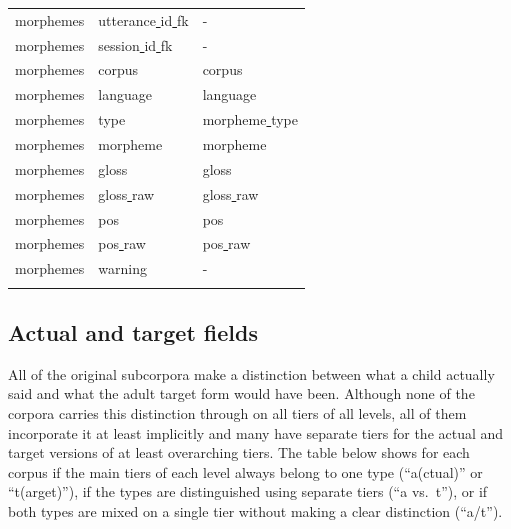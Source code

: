 \documentclass[a4paper, 11pt]{book}
\newcommand{\und}{\underline{{ }}\hspace{0.2mm}}	%
\begin{document}
\begin{longtable}[ht!]{lll}
		morphemes				& utterance\und id\und fk & - \\
		morphemes				& session\und id\und fk & - \\
		morphemes				& corpus				& corpus \\
		morphemes				& language				& language \\
		morphemes				& type					& morpheme\und type \\
		morphemes				& morpheme				& morpheme \\
		morphemes				& gloss					& gloss \\
		morphemes				& gloss\und raw			& gloss\und raw \\
		morphemes				& pos					& pos \\
		morphemes				& pos\und raw			& pos\und raw \\
		morphemes				& warning				& - \\

		\label{tab:Columns in the merged table}
\end{longtable}


\subsection{Actual and target fields}
\label{subsec:Actual and target fields}

All of the original subcorpora make a distinction between what a child actually said and what the adult target form would have been. Although none of the corpora carries this distinction through on all tiers of all levels, all of them incorporate it at least implicitly and many have separate tiers for the actual and target versions of at least overarching tiers. The table below shows for each corpus if the main tiers of each level always belong to one type (“a(ctual)” or “t(arget)”), if the types are distinguished using separate tiers (“a vs.\ t”), or if both types are mixed on a single tier without making a clear distinction (“a/t”).
\end{document}
